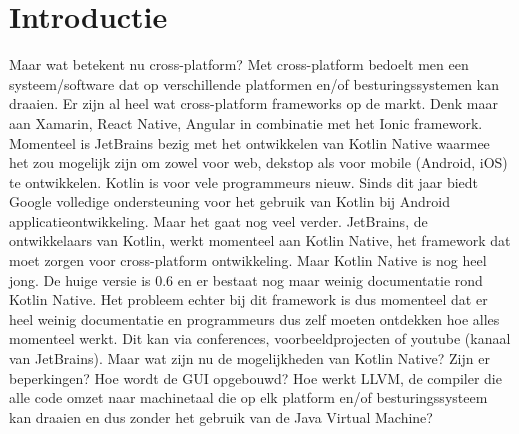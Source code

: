 	\section{Introductie} %
	\label{sec:introductie}
	
	Maar wat betekent nu cross-platform? Met cross-platform bedoelt men een systeem/software dat op verschillende platformen en/of besturingssystemen kan draaien. Er zijn al heel wat cross-platform frameworks op de markt. Denk maar aan Xamarin, React Native, Angular in combinatie met het Ionic framework. Momenteel is JetBrains bezig met het ontwikkelen van Kotlin Native waarmee het zou mogelijk zijn om zowel voor web, dekstop als voor mobile (Android, iOS) te ontwikkelen.
	\newline
	\newline
	Kotlin is voor vele programmeurs nieuw. Sinds dit jaar biedt Google volledige ondersteuning voor het gebruik van Kotlin bij Android applicatieontwikkeling. Maar het gaat nog veel verder. JetBrains, de ontwikkelaars van Kotlin, werkt momenteel aan Kotlin Native, het framework dat moet zorgen voor cross-platform ontwikkeling. Maar Kotlin Native is nog heel jong. De huige versie is 0.6 en er bestaat nog maar weinig documentatie rond Kotlin Native. Het probleem echter bij dit framework is dus momenteel dat er heel weinig documentatie en programmeurs dus zelf moeten ontdekken hoe alles momenteel werkt. Dit kan via conferences, voorbeeldprojecten of youtube (kanaal van JetBrains). Maar wat zijn nu de mogelijkheden van Kotlin Native? Zijn er beperkingen? Hoe wordt de GUI opgebouwd? Hoe werkt LLVM, de compiler die alle code omzet naar machinetaal die op elk platform en/of besturingssysteem kan draaien en dus zonder het gebruik van de Java Virtual Machine?
	
	
